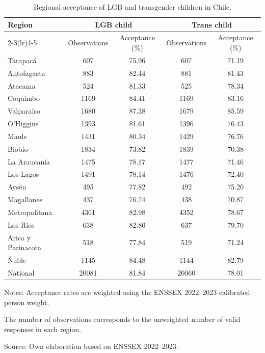 \begin{table}[H]
\begin{center}
\begin{threeparttable}
\captionsetup{margin=0.5cm}
\caption{Regional acceptance of LGB and transgender children in Chile.}
\label{tab:enssex_acceptance_region}
\footnotesize
\centering
\begin{tabular}{lcccc}
\toprule
Region & \multicolumn{2}{c}{LGB child} & \multicolumn{2}{c}{Trans child} \\
\cmidrule(lr){2-3}\cmidrule(lr){4-5}
 & Observations & Acceptance (\%) & Observations & Acceptance (\%) \\
\midrule
Tarapacá & 607 & 75.96 & 607 & 71.19 \\
Antofagasta & 883 & 82.44 & 881 & 81.43 \\
Atacama & 524 & 81.33 & 525 & 78.34 \\
Coquimbo & 1169 & 84.41 & 1169 & 83.16 \\
Valparaíso & 1680 & 87.38 & 1679 & 85.59 \\
O'Higgins & 1393 & 81.61 & 1396 & 76.43 \\
Maule & 1431 & 80.34 & 1429 & 76.76 \\
Biobío & 1834 & 73.82 & 1839 & 70.38 \\
La Araucanía & 1475 & 78.17 & 1477 & 71.46 \\
Los Lagos & 1491 & 78.14 & 1476 & 72.40 \\
Aysén & 495 & 77.82 & 492 & 75.20 \\
Magallanes & 437 & 76.74 & 438 & 70.87 \\
Metropolitana & 4361 & 82.98 & 4352 & 78.67 \\
Los Ríos & 638 & 82.80 & 637 & 79.70 \\
Arica y Parinacota & 518 & 77.84 & 519 & 71.24 \\
Ñuble & 1145 & 84.48 & 1144 & 82.79 \\
\midrule
National & 20081 & 81.84 & 20060 & 78.01 \\
\bottomrule
\end{tabular}
\begin{tablenotes}
\item Notes: Acceptance rates are weighted using the ENSSEX 2022--2023 calibrated person weight.\item The number of observations corresponds to the unweighted number of valid responses in each region.
\item Source: Own elaboration based on ENSSEX 2022--2023.
\end{tablenotes}
\end{threeparttable}
\end{center}
\end{table}
